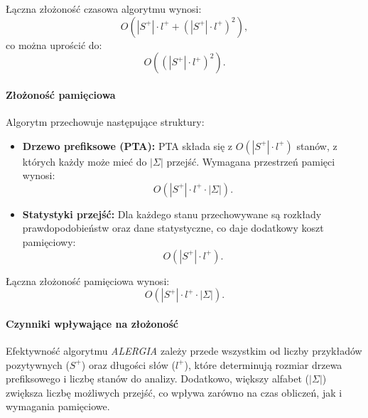 Łączna złożoność czasowa algorytmu wynosi:  
\[
O(|S^+| \cdot l^+ + (|S^+| \cdot l^+)^2),
\]  
co można uprościć do:  
\[
O((|S^+| \cdot l^+)^2).
\]

\paragraph*{Złożoność pamięciowa}  
Algorytm przechowuje następujące struktury:  
\begin{itemize}  
    \item \textbf{Drzewo prefiksowe (PTA):}  
    PTA składa się z \( O(|S^+| \cdot l^+) \) stanów, z których każdy może mieć do \( |\Sigma| \) przejść. Wymagana przestrzeń pamięci wynosi:  
    \[
    O(|S^+| \cdot l^+ \cdot |\Sigma|).
    \]  

    \item \textbf{Statystyki przejść:}  
    Dla każdego stanu przechowywane są rozkłady prawdopodobieństw oraz dane statystyczne, co daje dodatkowy koszt pamięciowy:  
    \[
    O(|S^+| \cdot l^+).
    \]  
\end{itemize}  

Łączna złożoność pamięciowa wynosi:  
\[
O(|S^+| \cdot l^+ \cdot |\Sigma|).
\]  

\paragraph*{Czynniki wpływające na złożoność}  
Efektywność algorytmu \textit{ALERGIA} zależy przede wszystkim od liczby przykładów pozytywnych (\( S^+ \)) oraz długości słów (\( l^+ \)), które determinują rozmiar drzewa prefiksowego i liczbę stanów do analizy. Dodatkowo, większy alfabet (\( |\Sigma| \)) zwiększa liczbę możliwych przejść, co wpływa zarówno na czas obliczeń, jak i wymagania pamięciowe.  
